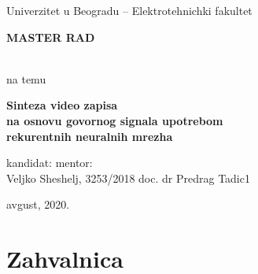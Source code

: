 \documentclass[a4paper, openany, oneside, 11pt]{book}
\begin{document}
\thispagestyle{empty}

\begin{center}
    \begin{Large}
        Univerzitet u Beogradu -- Elektrotehnichki fakultet \\ \vspace{5pt}
    \end{Large}
\end{center}
\vspace{100pt}
\begin{center}
	\begin{huge} \textbf{MASTER RAD} \end{huge} \\ 
        \vspace{10pt}
        na temu \\
        \vspace{10pt}
    \begin{huge} 
        \textbf{Sinteza video zapisa} \\ \vspace{-2pt}
        \textbf{na osnovu govornog signala upotrebom} \\ \vspace{-2pt}
        \textbf{rekurentnih neuralnih mrezha} \\
    \end{huge} 
\end{center}
\vspace{200pt}
\begin{center}
	\begin{large}
		kandidat: \hfill  mentor: \\ \vspace{5pt}
		Veljko Sheshelj, 3253/2018 \hfill doc. dr Predrag Tadic1
	\end{large}
\end{center}
\vfill
\begin{center}	
avgust, 2020.
\end{center}

\chapter*{Zahvalnica}


\newpage
\tableofcontents
\end{document}
